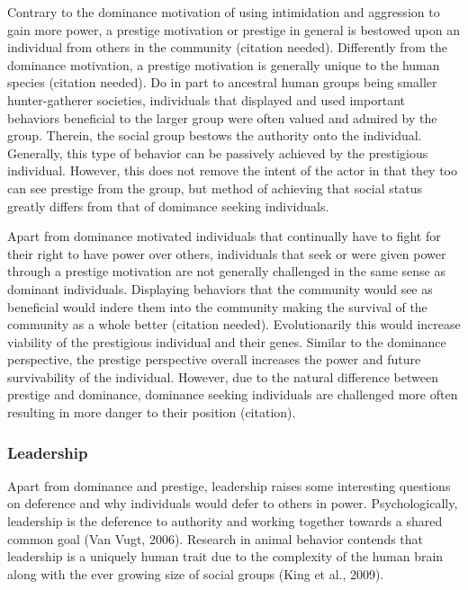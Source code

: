\documentclass[
  english,
  a4paper]{apa7}
\begin{document}
Contrary to the dominance motivation of using intimidation and aggression to gain more power, a prestige motivation or prestige in general is bestowed upon an individual from others in the community (citation needed). Differently from the dominance motivation, a prestige motivation is generally unique to the human species (citation needed). Do in part to ancestral human groups being smaller hunter-gatherer societies, individuals that displayed and used important behaviors beneficial to the larger group were often valued and admired by the group. Therein, the social group bestows the authority onto the individual. Generally, this type of behavior can be passively achieved by the prestigious individual. However, this does not remove the intent of the actor in that they too can see prestige from the group, but method of achieving that social status greatly differs from that of dominance seeking individuals.

Apart from dominance motivated individuals that continually have to fight for their right to have power over others, individuals that seek or were given power through a prestige motivation are not generally challenged in the same sense as dominant individuals. Displaying behaviors that the community would see as beneficial would indere them into the community making the survival of the community as a whole better (citation needed). Evolutionarily this would increase viability of the prestigious individual and their genes. Similar to the dominance perspective, the prestige perspective overall increases the power and future survivability of the individual. However, due to the natural difference between prestige and dominance, dominance seeking individuals are challenged more often resulting in more danger to their position (citation).

\hypertarget{leadership}{%
\subsubsection{Leadership}\label{leadership}}

Apart from dominance and prestige, leadership raises some interesting questions on deference and why individuals would defer to others in power. Psychologically, leadership is the deference to authority and working together towards a shared common goal (Van Vugt, 2006). Research in animal behavior contends that leadership is a uniquely human trait due to the complexity of the human brain along with the ever growing size of social groups (King et al., 2009).
\end{document}
